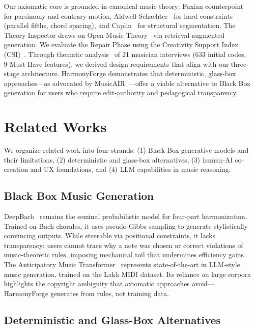 Our axiomatic core is grounded in canonical music theory: Fuxian counterpoint~\cite{fux1725} for parsimony and contrary motion, Aldwell-Schachter~\cite{aldwellschachter} for hard constraints (parallel fifths, chord spacing), and Caplin~\cite{caplin1998} for structural segmentation. The Theory Inspector draws on Open Music Theory~\cite{gotham2024} via retrieval-augmented generation. We evaluate the Repair Phase using the Creativity Support Index (CSI)~\cite{tchemeube2025}. Through thematic analysis~\cite{braun2006,zambrano2025} of 21 musician interviews (633 initial codes, 9 Must Have features), we derived design requirements that align with our three-stage architecture. HarmonyForge demonstrates that deterministic, glass-box approaches---as advocated by MusicAIR~\cite{liao2025}---offer a viable alternative to Black Box generation for users who require edit-authority and pedagogical transparency.

\section{Related Works}

We organize related work into four strands: (1) Black Box generative models and their limitations, (2) deterministic and glass-box alternatives, (3) human-AI co-creation and UX foundations, and (4) LLM capabilities in music reasoning.

\subsection{Black Box Music Generation}

DeepBach~\cite{hadjeres2017} remains the seminal probabilistic model for four-part harmonization. Trained on Bach chorales, it uses pseudo-Gibbs sampling to generate stylistically convincing outputs. While steerable via positional constraints, it lacks transparency: users cannot trace why a note was chosen or correct violations of music-theoretic rules, imposing mechanical toil that undermines efficiency gains. The Anticipatory Music Transformer~\cite{thickstun2024} represents state-of-the-art in LLM-style music generation, trained on the Lakh MIDI dataset. Its reliance on large corpora highlights the copyright ambiguity that axiomatic approaches avoid---HarmonyForge generates from rules, not training data.

\subsection{Deterministic and Glass-Box Alternatives}

